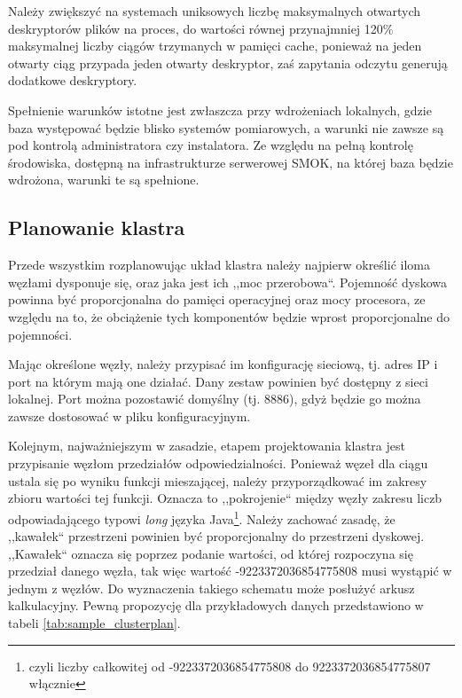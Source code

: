 \documentclass[a4paper,polish,12pt,twoside]{article}
\begin{document}
Należy zwiększyć na systemach uniksowych liczbę maksymalnych otwartych deskryptorów plików na proces, do wartości równej przynajmniej 120\% maksymalnej liczby ciągów trzymanych w pamięci cache, ponieważ na jeden otwarty ciąg przypada jeden otwarty deskryptor, zaś zapytania odczytu generują dodatkowe deskryptory.

Spełnienie warunków istotne jest zwłaszcza przy wdrożeniach lokalnych, gdzie baza występować będzie blisko systemów pomiarowych, a warunki nie zawsze są pod kontrolą administratora czy instalatora. Ze względu na pełną kontrolę środowiska, dostępną na infrastrukturze serwerowej SMOK, na której baza będzie wdrożona, warunki te są spełnione.

	\subsection{Planowanie klastra}
Przede wszystkim rozplanowując układ klastra należy najpierw określić iloma węzłami dysponuje się, oraz jaka jest ich ,,moc przerobowa``. Pojemność dyskowa powinna być proporcjonalna do pamięci operacyjnej oraz mocy procesora, ze względu na to, że obciążenie tych komponentów będzie wprost proporcjonalne do pojemności.

Mając określone węzły, należy przypisać im konfigurację sieciową, tj. adres IP i port na którym mają one działać. Dany zestaw powinien być dostępny z sieci lokalnej. Port można pozostawić domyślny (tj. 8886), gdyż będzie go można zawsze dostosować w pliku konfiguracyjnym.

Kolejnym, najważniejszym w zasadzie, etapem projektowania klastra jest przypisanie węzłom przedziałów odpowiedzialności. Ponieważ węzeł dla ciągu ustala się po wyniku funkcji mieszającej, należy przyporządkować im zakresy zbioru wartości tej funkcji. Oznacza to ,,pokrojenie`` między węzły zakresu liczb odpowiadającego typowi \textit{long} języka Java\footnote{czyli liczby całkowitej od -9223372036854775808 do 
9223372036854775807 włącznie}. Należy zachować zasadę, że ,,kawałek`` przestrzeni powinien być  proporcjonalny do przestrzeni dyskowej. ,,Kawałek`` oznacza się poprzez podanie wartości, od której rozpoczyna się przedział danego węzła, tak więc wartość -9223372036854775808 musi wystąpić w jednym z węzłów. Do wyznaczenia takiego schematu może posłużyć arkusz kalkulacyjny. Pewną propozycję dla przykładowych danych przedstawiono w tabeli \ref{tab:sample_clusterplan}.
\end{document}
